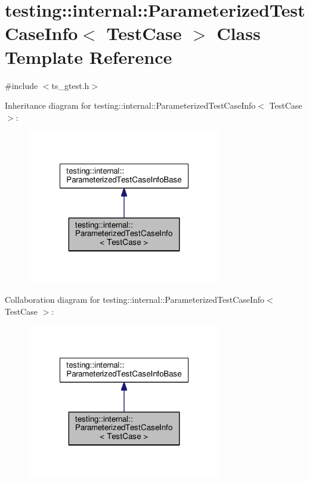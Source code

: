 \hypertarget{classtesting_1_1internal_1_1ParameterizedTestCaseInfo}{\section{testing\-:\-:internal\-:\-:Parameterized\-Test\-Case\-Info$<$ Test\-Case $>$ Class Template Reference}
\label{classtesting_1_1internal_1_1ParameterizedTestCaseInfo}
}


{\ttfamily \#include $<$ts\-\_\-gtest.\-h$>$}



Inheritance diagram for testing\-:\-:internal\-:\-:Parameterized\-Test\-Case\-Info$<$ Test\-Case $>$\-:\nopagebreak
\begin{figure}[H]
\begin{center}
\leavevmode
\includegraphics[width=240pt]{classtesting_1_1internal_1_1ParameterizedTestCaseInfo__inherit__graph}
\end{center}
\end{figure}


Collaboration diagram for testing\-:\-:internal\-:\-:Parameterized\-Test\-Case\-Info$<$ Test\-Case $>$\-:\nopagebreak
\begin{figure}[H]
\begin{center}
\leavevmode
\includegraphics[width=240pt]{classtesting_1_1internal_1_1ParameterizedTestCaseInfo__coll__graph}
\end{center}
\end{figure}
